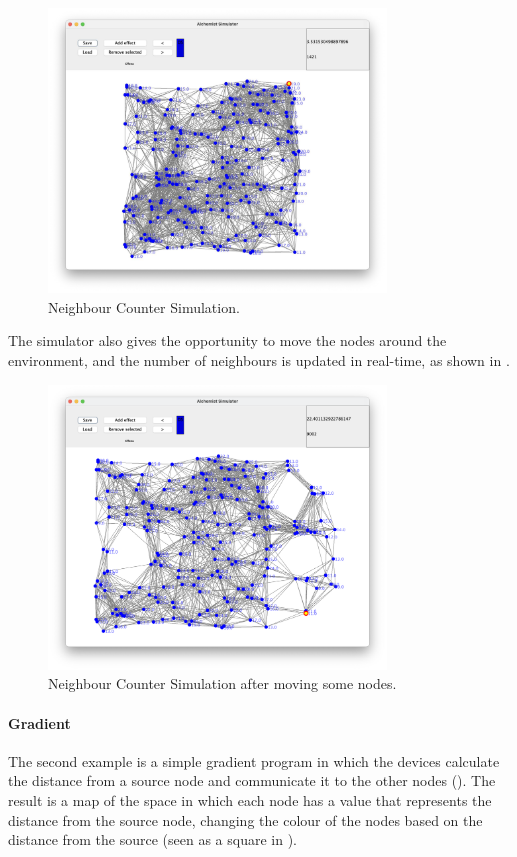 \begin{figure}[ht!]
    \centering
    \includegraphics[width=0.8\textwidth]{figures/neighborCounter}
    \caption{Neighbour Counter Simulation.}
    \label{fig:neighbour-counter}
\end{figure}

The simulator also gives the opportunity to move the nodes around the environment, and the number of neighbours is updated
in real-time, as shown in .
\begin{figure}[ht!]
    \centering
    \includegraphics[width=0.8\textwidth]{figures/neighborCounterMoved}
    \caption{Neighbour Counter Simulation after moving some nodes.}
    \label{fig:neighbor-counter-moved}
\end{figure}

\paragraph{Gradient}
The second example is a simple gradient program in which the devices calculate the distance from a source node and
communicate it to the other nodes ().
The result is a map of the space in which each node has a value that represents the distance from the source node,
changing the colour of the nodes based on the distance from the source (seen as a square in ).

